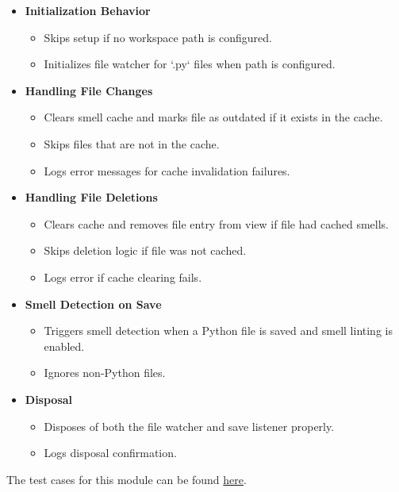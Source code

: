 \documentclass[12pt, titlepage]{article}
\begin{document}
\begin{itemize}
  \item \textbf{Initialization Behavior}
    \begin{itemize}
      \item Skips setup if no workspace path is configured.
      \item Initializes file watcher for `.py` files when path is configured.
    \end{itemize}

  \item \textbf{Handling File Changes}
    \begin{itemize}
      \item Clears smell cache and marks file as outdated if it exists in the cache.
      \item Skips files that are not in the cache.
      \item Logs error messages for cache invalidation failures.
    \end{itemize}

  \item \textbf{Handling File Deletions}
    \begin{itemize}
      \item Clears cache and removes file entry from view if file had cached smells.
      \item Skips deletion logic if file was not cached.
      \item Logs error if cache clearing fails.
    \end{itemize}

  \item \textbf{Smell Detection on Save}
    \begin{itemize}
      \item Triggers smell detection when a Python file is saved and smell linting is enabled.
      \item Ignores non-Python files.
    \end{itemize}

  \item \textbf{Disposal}
    \begin{itemize}
      \item Disposes of both the file watcher and save listener properly.
      \item Logs disposal confirmation.
    \end{itemize}
\end{itemize}

\noindent The test cases for this module can be found
\href{https://github.com/ssm-lab/capstone--sco-vs-code-plugin/blob/plugin-multi-file/test/workspaceModifiedListener.test.ts}{here}.
\end{document}
